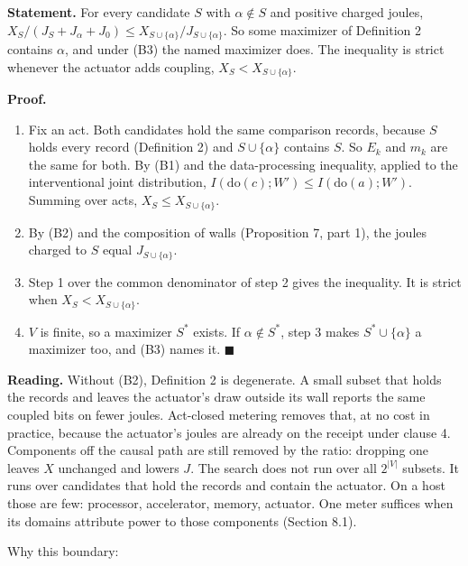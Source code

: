 \documentclass[
  10pt,
]{article}
\providecommand{\tightlist}{%
  \setlength{\itemsep}{0pt}\setlength{\parskip}{0pt}}
\begin{document}
\textbf{Statement.} For every candidate \(S\) with \(\alpha \notin S\)
and positive charged joules,
\(X_S / (J_S + J_\alpha + J_0) \le X_{S\cup\{\alpha\}} / J_{S\cup\{\alpha\}}\).
So some maximizer of Definition 2 contains \(\alpha\), and under (B3)
the named maximizer does. The inequality is strict whenever the actuator
adds coupling, \(X_S < X_{S\cup\{\alpha\}}\).

\textbf{Proof.}

\begin{enumerate}
\def\labelenumi{\arabic{enumi}.}
\tightlist
\item
  Fix an act. Both candidates hold the same comparison records, because
  \(S\) holds every record (Definition 2) and \(S \cup \{\alpha\}\)
  contains \(S\). So \(E_k\) and \(m_k\) are the same for both. By (B1)
  and the data-processing inequality, applied to the interventional
  joint distribution,
  \(I(\mathrm{do}(c); W') \le I(\mathrm{do}(a); W')\). Summing over
  acts, \(X_S \le X_{S\cup\{\alpha\}}\).
\item
  By (B2) and the composition of walls (Proposition 7, part 1), the
  joules charged to \(S\) equal \(J_{S\cup\{\alpha\}}\).
\item
  Step 1 over the common denominator of step 2 gives the inequality. It
  is strict when \(X_S < X_{S\cup\{\alpha\}}\).
\item
  \(V\) is finite, so a maximizer \(S^*\) exists. If
  \(\alpha \notin S^*\), step 3 makes \(S^* \cup \{\alpha\}\) a
  maximizer too, and (B3) names it. \(\blacksquare\)
\end{enumerate}

\textbf{Reading.} Without (B2), Definition 2 is degenerate. A small
subset that holds the records and leaves the actuator's draw outside its
wall reports the same coupled bits on fewer joules. Act-closed metering
removes that, at no cost in practice, because the actuator's joules are
already on the receipt under clause 4. Components off the causal path
are still removed by the ratio: dropping one leaves \(X\) unchanged and
lowers \(J\). The search does not run over all \(2^{|V|}\) subsets. It
runs over candidates that hold the records and contain the actuator. On
a host those are few: processor, accelerator, memory, actuator. One
meter suffices when its domains attribute power to those components
(Section 8.1).

Why this boundary:
\end{document}
